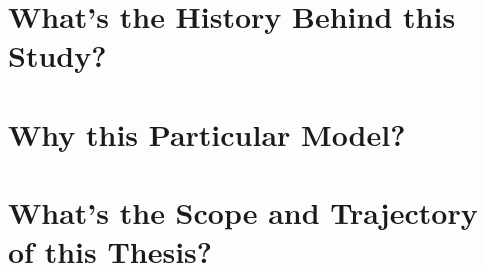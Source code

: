 \section{What's the History Behind this Study?}

\section{Why this Particular Model?}

\section{What's the Scope and Trajectory of this Thesis?}
